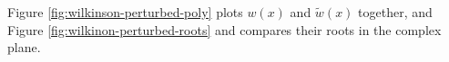 Figure \ref{fig:wilkinson-perturbed-poly} plots $w(x)$ and $\tilde{w}(x)$ together, and Figure \ref{fig:wilkinon-perturbed-roots} and compares their roots in the complex plane.

